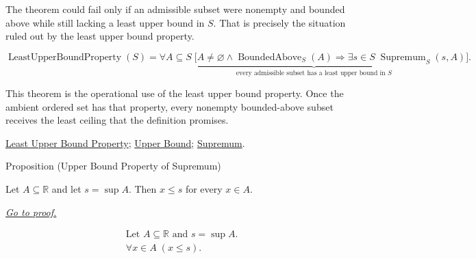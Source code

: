 \begin{remark*}
The theorem could fail only if an admissible subset were nonempty and bounded above while still lacking a least upper bound in $S$. That is precisely the situation ruled out by the least upper bound property.
\end{remark*}

\begin{remark*}
\[
\operatorname{LeastUpperBoundProperty}(S)
=
\underbrace{
\forall A\subseteq S\;
\bigl[A\ne\varnothing\land \operatorname{BoundedAbove}_S(A)
\Longrightarrow
\exists s\in S\;\operatorname{Supremum}_S(s,A)\bigr]
}_{\text{every admissible subset has a least upper bound in }S}.
\]
\end{remark*}

\begin{remark*}[Interpretation]
This theorem is the operational use of the least upper bound property. Once the ambient ordered set has that property, every nonempty bounded-above subset receives the least ceiling that the definition promises.
\end{remark*}

\begin{dependencies}
\hyperref[def:least-upper-bound-property]{Least Upper Bound Property};
\hyperref[def:upper-bound]{Upper Bound};
\hyperref[def:supremum]{Supremum}.
\end{dependencies}



\begin{propositionbox}{Proposition (Upper Bound Property of Supremum)}
\begin{proposition}
\label{prop:upper-bound-property-of-supremum}
Let $A\subseteq\mathbb{R}$ and let $s=\sup A$. Then $x\le s$ for every $x\in A$.

\smallskip
\noindent
\hyperref[prf:upper-bound-property-of-supremum]{\textit{Go to proof.}}
\end{proposition}
\end{propositionbox}

\begin{remark*}
\[
\begin{aligned}
&\text{Let }A\subseteq\mathbb{R}\text{ and }s=\sup A.\\
&\forall x\in A\;(x\le s).
\end{aligned}
\]
\end{remark*}

